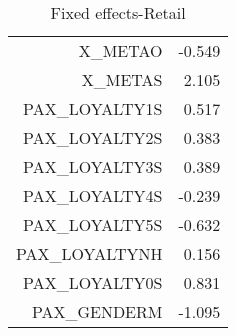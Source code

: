 \documentclass{article}
\begin{document}
\begin{table}
\begin{tabular}{rr}
	X\_METAO	                     &      -0.549            \\         
	X\_METAS	                     &      2.105             \\        
	PAX\_LOYALTY1S    	     &      0.517             \\        
	PAX\_LOYALTY2S    	     &       0.383            \\         
	PAX\_LOYALTY3S    	     &       0.389            \\         
	PAX\_LOYALTY4S    	     &       -0.239           \\          
	PAX\_LOYALTY5S    	     &       -0.632           \\          
	PAX\_LOYALTYNH    	     &        0.156           \\          
	PAX\_LOYALTY0S	             &        0.831           \\          
	PAX\_GENDERM	             &       -1.095           \\
	\hline 
	\hline   
\end{tabular}  
\caption{Fixed effects-Retail} 
\end{table}
\end{document}
